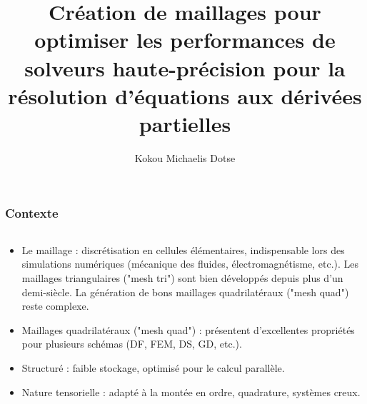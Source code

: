 \documentclass[compress,10pt,aspectratio=169]{beamer}
\title[]{Création de maillages pour optimiser les performances de solveurs haute-précision pour la résolution d'équations aux dérivées partielles\vspace{0.5cm}}
\subtitle[]{Kokou Michaelis Dotse\vspace{0.5cm}}
\date[]{}
\begin{document}
\MakeTitlePage




\begin{frame}
\frametitle{Contexte}
\small
\begin{columns}
    \begin{column}{0.8\textwidth}
    \vspace{-0.3cm}
\begin{itemize}
\item {\color{onera} Le maillage :} discrétisation en cellules élémentaires, indispensable lors des simulations numériques (mécanique des fluides, électromagnétisme, etc.). Les maillages triangulaires ("mesh tri") sont bien développés depuis plus d'un demi-siècle. La génération de bons maillages quadrilatéraux ("mesh quad") reste complexe.\\\vspace{0.25cm}

\item {\color{onera} Maillages quadrilatéraux ("mesh quad") :} présentent d'excellentes propriétés pour plusieurs schémas (DF, FEM, DS, GD, etc.).\\\vspace{0.2cm}

\item {\color{onera} Structuré :} faible stockage, optimisé pour le calcul parallèle.\\\vspace{0.2cm}

\item {\color{onera} Nature tensorielle :} adapté à la montée en ordre, quadrature, systèmes creux.\\\vspace{0.2cm}


\end{itemize}
\end{column}
\end{columns}
\end{frame}
\end{document}
